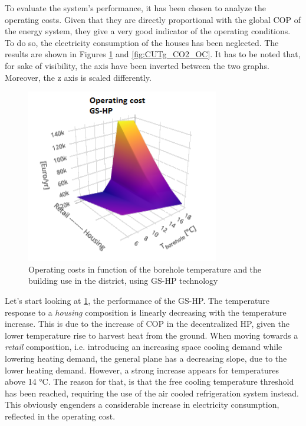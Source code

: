 \documentclass{article}
\begin{document}
To evaluate the system's performance, it has been chosen to analyze the operating costs. Given that they are directly proportional with the global COP of the energy system, they give a very good indicator of the operating conditions. To do so, the electricity consumption of the houses has been neglected. The results are shown in Figures \ref{fig:CUTg_OC} and \ref{fig:CUTg_CO2_OC}. It has to be noted that, for sake of visibility, the axis have been inverted between the two graphs. Moreover, the z axis is scaled differently.\\

\begin{figure}[htp]
	\centering
	\includegraphics[width=0.75\textwidth]{CUTg_SA_OC.png}
	\caption{Operating costs in function of the borehole temperature and the building use in the district, using GS-HP technology}
	\label{fig:CUTg_OC}
\end{figure}

Let's start looking at \ref{fig:CUTg_OC}, the performance of the GS-HP. The temperature response to a \textit{housing} composition is linearly decreasing with the temperature increase. This is due to the increase of COP in the decentralized HP, given the lower temperature rise to harvest heat from the ground. When moving towards a \textit{retail} composition, i.e. introducing an increasing space cooling demand while lowering heating demand, the general plane has a decreasing slope, due to the lower heating demand. However, a strong increase appears for temperatures above 14 \si{\celsius}. The reason for that, is that the free cooling temperature threshold has been reached, requiring the use of the air cooled refrigeration system instead. This obviously engenders a considerable increase in electricity consumption, reflected in the operating cost.
\end{document}

